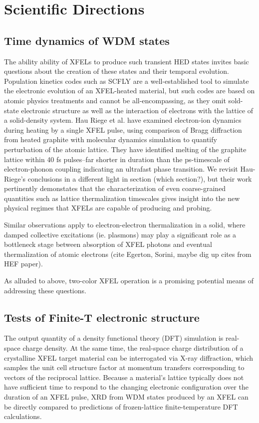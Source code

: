 \documentclass [11pt, proquest, article] {uwthesis}[2016/11/22]
\begin{document}
\section{Scientific Directions}
\subsection{Time dynamics of WDM states}
The ability ability of XFELs to produce such transient HED states invites basic questions about the creation of these states and their temporal evolution. Population kinetics codes such as SCFLY are a well-established tool to simulate the electronic evolution of an XFEL-heated material, but such codes are based on atomic physics treatments and cannot be all-encompassing, as they omit sold-state electronic structure as well as the interaction of electrons with the lattice of a solid-density system.  Hau Riege et al. have examined electron-ion dynamics during heating by a single XFEL pulse, using comparison of Bragg diffraction from heated graphite with molecular dynamics simulation to quantify perturbation of the atomic lattice. They have identified melting of the graphite lattice within 40 fs pulses--far shorter in duration than the ps-timescale of electron-phonon coupling indicating an ultrafast phase transition. We revisit Hau-Riege's conclusions in a different light in section (which section?), but their work pertinently demonstates that the characterization of even coarse-grained quantities such as lattice thermalization timescales gives insight into the new physical regimes that XFELs are capable of producing and probing. 

Similar observations apply to electron-electron thermalization in a solid, where damped collective excitations (ie. plasmons) may play a significant role as a bottleneck stage between absorption of XFEL photons and eventual thermalization of atomic electrons (cite Egerton, Sorini, maybe dig up cites from HEF paper). 

As alluded to above, two-color XFEL operation is a promising potential means of addressing these questions. 

\subsection{Tests of Finite-T electronic structure}
The output quantity of a density functional theory (DFT) simulation is real-space charge density. At the same time, the real-space charge distribution of a crystalline XFEL target material can be interrogated via X-ray diffraction, which samples the unit cell structure factor at momentum transfers corresponding to vectors of the reciprocal lattice. Because a material's lattice typically does not have sufficient time to respond to the changing electronic configuration over the duration of an XFEL pulse, XRD from WDM states produced by an XFEL can be directly compared to predictions of frozen-lattice finite-temperature DFT calculations.
\end{document}
